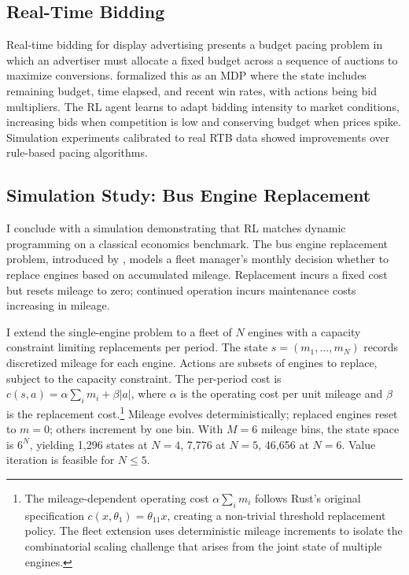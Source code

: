\subsection{Real-Time Bidding}
\label{sec:rtb}

Real-time bidding for display advertising presents a budget pacing problem in which an advertiser must allocate a fixed budget across a sequence of auctions to maximize conversions. \citet{Wu2018rtb} formalized this as an MDP where the state includes remaining budget, time elapsed, and recent win rates, with actions being bid multipliers. The RL agent learns to adapt bidding intensity to market conditions, increasing bids when competition is low and conserving budget when prices spike. Simulation experiments calibrated to real RTB data showed improvements over rule-based pacing algorithms.


\subsection{Simulation Study: Bus Engine Replacement}
\label{sec:bus_engine}

I conclude with a simulation demonstrating that RL matches dynamic programming on a classical economics benchmark. The bus engine replacement problem, introduced by \citet{Rust1987}, models a fleet manager's monthly decision whether to replace engines based on accumulated mileage. Replacement incurs a fixed cost but resets mileage to zero; continued operation incurs maintenance costs increasing in mileage.

I extend the single-engine problem to a fleet of $N$ engines with a capacity constraint limiting replacements per period. The state $s = (m_1, \ldots, m_N)$ records discretized mileage for each engine. Actions are subsets of engines to replace, subject to the capacity constraint. The per-period cost is $c(s, a) = \alpha \sum_{i} m_i + \beta |a|$, where $\alpha$ is the operating cost per unit mileage and $\beta$ is the replacement cost.\footnote{The mileage-dependent operating cost $\alpha \sum_i m_i$ follows Rust's original specification $c(x, \theta_1) = \theta_{11} x$, creating a non-trivial threshold replacement policy. The fleet extension uses deterministic mileage increments to isolate the combinatorial scaling challenge that arises from the joint state of multiple engines.} Mileage evolves deterministically; replaced engines reset to $m = 0$; others increment by one bin. With $M = 6$ mileage bins, the state space is $6^N$, yielding 1,296 states at $N = 4$, 7,776 at $N = 5$, 46,656 at $N = 6$. Value iteration is feasible for $N \leq 5$.

